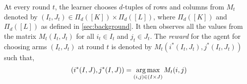 At every round $t$, the learner chooses $d$-tuples of rows and columns from $M_t$ denoted by $(I_t,J_t)\in \Pi_d([K])\times \Pi_d([L])$, where $\Pi_{d}([K])$ and $\Pi_{d}([L])$ as defined in  \cref{sec:background}.  %
It then observes all the values from the matrix $M_{t}(I_t,J_t)$ for all $i_t\in I_t$ and $j_t \in J_t$. The \emph{reward} for the agent for choosing arms $(I_t,J_t)$ at round $t$ is denoted by $M_t(i^\ast(I_t,J_t),j^\ast(I_t,J_t))$ such that,
\begin{align}
  (i^\ast(I,J),j^\ast(I,J)) = \mathop{\rm arg\,max}_{(i,j) \in (I\times J)} M_{t}(i,j)
  \label{eq:reward}
\end{align}






